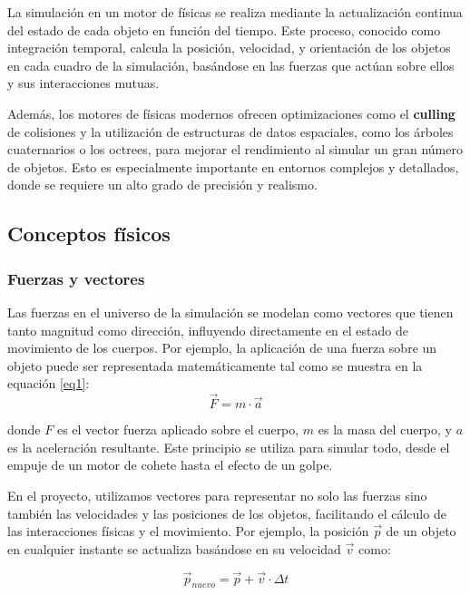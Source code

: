 La simulación en un motor de físicas se realiza mediante la actualización continua del estado de cada objeto en función del tiempo. Este proceso, conocido como integración temporal, calcula la posición, velocidad, y orientación de los objetos en cada cuadro de la simulación, basándose en las fuerzas que actúan sobre ellos y sus interacciones mutuas.

Además, los motores de físicas modernos ofrecen optimizaciones como el \textbf{culling} de colisiones y la utilización de estructuras de datos espaciales, como los árboles cuaternarios o los octrees, para mejorar el rendimiento al simular un gran número de objetos. Esto es especialmente importante en entornos complejos y detallados, donde se requiere un alto grado de precisión y realismo.

\subsection{Conceptos físicos}

\subsubsection{Fuerzas y vectores}
Las fuerzas en el universo de la simulación se modelan como vectores que tienen tanto magnitud como dirección, influyendo directamente en el estado de movimiento de los cuerpos. Por ejemplo, la aplicación de una fuerza sobre un objeto puede ser representada matemáticamente tal como se muestra en la equación \ref{eq1}:
\begin{equation}
\label{eq1}
    \vec{F} = m \cdot \vec{a}
\end{equation}


donde \(F\) es el vector fuerza aplicado sobre el cuerpo, \(m\) es la masa del cuerpo, y \(a\) es la aceleración resultante. Este principio se utiliza para simular todo, desde el empuje de un motor de cohete hasta el efecto de un golpe.

En el proyecto, utilizamos vectores para representar no solo las fuerzas sino también las velocidades y las posiciones de los objetos, facilitando el cálculo de las interacciones físicas y el movimiento. Por ejemplo, la posición \(\vec{p}\) de un objeto en cualquier instante se actualiza basándose en su velocidad \(\vec{v}\) como:

\begin{equation}
\label{eq2}
    \vec{p}_{nuevo} = \vec{p} + \vec{v} \cdot \Delta t
\end{equation}

